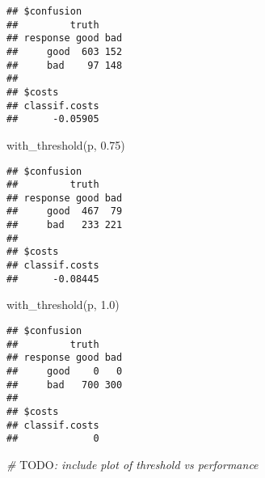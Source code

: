 \documentclass[
]{scrbook}
\newenvironment{Shaded}{\begin{snugshade}}{\end{snugshade}}
\newcommand{\AlertTok}[1]{\textcolor[rgb]{0.94,0.16,0.16}{#1}}
\newcommand{\AttributeTok}[1]{\textcolor[rgb]{0.77,0.63,0.00}{#1}}
\newcommand{\CommentTok}[1]{\textcolor[rgb]{0.56,0.35,0.01}{\textit{#1}}}
\newcommand{\ControlFlowTok}[1]{\textcolor[rgb]{0.13,0.29,0.53}{\textbf{#1}}}
\newcommand{\FloatTok}[1]{\textcolor[rgb]{0.00,0.00,0.81}{#1}}
\newcommand{\FunctionTok}[1]{\textcolor[rgb]{0.00,0.00,0.00}{#1}}
\newcommand{\NormalTok}[1]{#1}
\newcommand{\OtherTok}[1]{\textcolor[rgb]{0.56,0.35,0.01}{#1}}
\newcommand{\SpecialCharTok}[1]{\textcolor[rgb]{0.00,0.00,0.00}{#1}}
\renewenvironment{Shaded} {\begin{snugshade}\small} {\end{snugshade}}
\begin{document}
\begin{Shaded}
\end{Shaded}

\begin{verbatim}
## $confusion
##         truth
## response good bad
##     good  603 152
##     bad    97 148
## 
## $costs
## classif.costs 
##      -0.05905
\end{verbatim}

\begin{Shaded}
\begin{Highlighting}[]
\FunctionTok{with\_threshold}\NormalTok{(p, }\FloatTok{0.75}\NormalTok{)}
\end{Highlighting}
\end{Shaded}

\begin{verbatim}
## $confusion
##         truth
## response good bad
##     good  467  79
##     bad   233 221
## 
## $costs
## classif.costs 
##      -0.08445
\end{verbatim}

\begin{Shaded}
\begin{Highlighting}[]
\FunctionTok{with\_threshold}\NormalTok{(p, }\FloatTok{1.0}\NormalTok{)}
\end{Highlighting}
\end{Shaded}

\begin{verbatim}
## $confusion
##         truth
## response good bad
##     good    0   0
##     bad   700 300
## 
## $costs
## classif.costs 
##             0
\end{verbatim}

\begin{Shaded}
\begin{Highlighting}[]
\CommentTok{\# }\AlertTok{TODO}\CommentTok{: include plot of threshold vs performance}
\end{Highlighting}
\end{Shaded}
\end{document}
